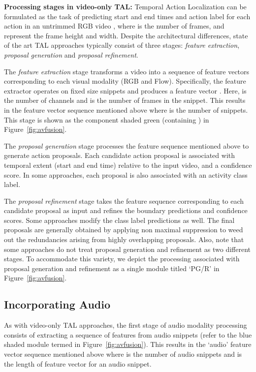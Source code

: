 \documentclass[10pt,twocolumn,letterpaper]{article}
\begin{document}
\noindent \textbf{Processing stages in video-only {TAL}:} Temporal Action Localization can be formulated as the task of predicting start and end times  and action label  for each action in an untrimmed RGB video , where  is the number of frames,  and  represent the frame height and width. Despite the architectural differences, state of the art TAL approaches typically consist of three stages: \textit{feature extraction}, \textit{proposal generation} and \textit{proposal refinement}. 


The \textit{feature extraction} stage transforms a video into a sequence of feature vectors corresponding to each visual modality (RGB and Flow). Specifically, the feature extractor operates on fixed size snippets  and produces a feature vector . Here,  is the number of channels and  is the number of frames in the snippet. This results in the feature vector sequence  mentioned above where  is the number of snippets. This stage is shown as the component shaded green (containing ) in Figure~\ref{fig:avfusion}.


The \textit{proposal generation} stage processes the feature sequence mentioned above to generate action proposals. Each candidate action proposal is associated with temporal extent (start and end time) relative to the input video, and a confidence score. In some approaches, each proposal is also associated with an activity class label.


The \textit{proposal refinement} stage takes the feature sequence corresponding to each candidate proposal as input and refines the boundary predictions and confidence scores. Some approaches modify the class label predictions as well. The final proposals are generally obtained by applying non maximal suppression to weed out the redundancies arising from highly overlapping proposals. Also, note that some approaches do not treat proposal generation and refinement as two different stages. To accommodate this variety, we depict the processing associated with proposal generation and refinement as a single module titled `PG/R' in Figure~\ref{fig:avfusion}.



\subsection{Incorporating Audio}

 As with video-only TAL approaches, the first stage of audio modality processing consists of extracting a sequence of features from audio snippets (refer to the blue shaded module termed  in Figure~\ref{fig:avfusion}). This results in the `audio' feature vector sequence  mentioned above where  is the number of audio snippets and  is the length of feature vector for an audio snippet. 
 
\end{document}
